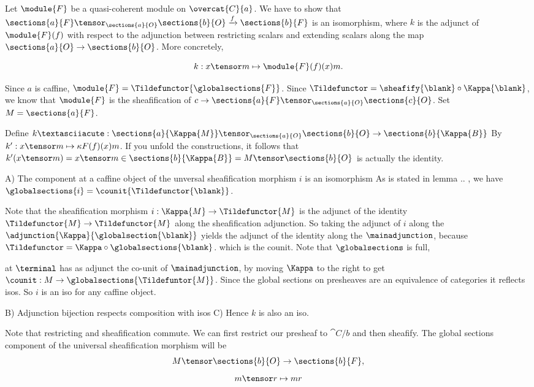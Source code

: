 Let $\module{F}$ be a quasi-coherent module on $\overcat{C}{a}$.
We have to show that $\sections{a}{F} \tensor_{\sections{a}{O}} \sections{b}{O} \xrightarrow{f} \sections{b}{F}$ is an isomorphism, 
where $k$ is the adjunct of $\module{F}(f)$ with respect to the adjunction between restricting scalars and extending scalars along the map 
$\sections{a}{O} \rightarrow \sections{b}{O}$. More concretely, 

\[k: x \tensor m \mapsto \module{F}(f)(x)m.\]

Since $a$ is caffine, $\module{F}= \Tildefunctor{\globalsections{F}}$.
Since $\Tildefunctor = \sheafify{\blank} \circ \Kappa{\blank}$, we know that $\module{F}$ is the sheafification of $c \rightarrow \sections{a}{F} \tensor_{\sections{a}{O}} \sections{c}{O}$.
Set $M = \sections{a}{F}$.

Define $k´: \sections{a}{\Kappa{M}} \tensor_{\sections{a}{O}} \sections{b}{O} \rightarrow \sections{b}{\Kappa{B}}$
By $k':x \tensor m \mapsto \kappa{F}(f)(x) m$.
If you unfold the constructions, it follows that $k'(x\tensor m) = x\tensor m \in \sections{b}{\Kappa{B}} = M \tensor \sections{b}{O}$ is actually the identity.

A) The component at a caffine object of the unversal sheafification morphism $i$ is an isomorphism
As is stated in lemma .. , we have $\globalsections{i} = \counit{\Tildefunctor{\blank}}$. 

Note that the sheafification morphism $i: \Kappa{M} \rightarrow \Tildefunctor{M}$ is the adjunct of the identity $\Tildefunctor{M} \rightarrow \Tildefunctor{M}$ along the sheafification adjunction. So taking the adjunct of $i$ along the $\adjunction{\Kappa}{\globalsection{\blank}}$ yields the adjunct of the identity along the $\mainadjunction$, because $\Tildefunctor = \Kappa \circ \globalsections{\blank}$. which is the counit.
Note that $\globalsections$ is full,

at $\terminal$ has as adjunct the co-unit of $\mainadjunction$, by moving $\Kappa$ to the right to get $\counit: M \rightarrow \globalsections{\Tildefuntor{M}}$. 
Since the global sections on presheaves are an equivalence of categories it reflects isos. So $i$ is an iso for any caffine object.



B) Adjunction bijection respects composition with isos
C) Hence $k$ is also an iso.



Note that restricting and sheafification commute.%
We can first restrict our presheaf to $\cat{C}/b$ and then sheafify. 
The global sections component of the universal sheafification morphism will be 
\[M \tensor \sections{b}{O} \rightarrow \sections{b}{F},\]
\[m \tensor r \mapsto mr\]


